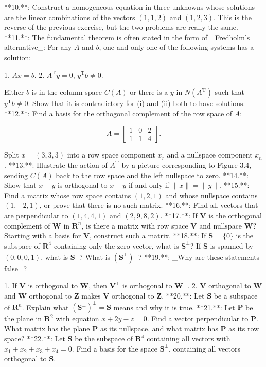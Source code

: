

**10.**: Construct a homogeneous equation in three unknowns whose solutions are the linear combinations of the vectors \((1,1,2)\) and \((1,2,3)\). This is the reverse of the previous exercise, but the two problems are really the same.
**11.**: The fundamental theorem is often stated in the form of _Fredholm's alternative_: For any \(A\) and \(b\), one and only one of the following systems has a solution:

1. \(Ax=b\).
2. \(A^{\mathrm{T}}y=0\), \(y^{\mathrm{T}}b\neq 0\).

Either \(b\) is in the column space \(C(A)\) or there is a \(y\) in \(N(A^{\mathrm{T}})\) such that \(y^{\mathrm{T}}b\neq 0\). Show that it is contradictory for (i) and (ii) both to have solutions.
**12.**: Find a basis for the orthogonal complement of the row space of \(A\):

\[A=\begin{bmatrix}1&0&2\\ 1&1&4\end{bmatrix}.\]

Split \(x=(3,3,3)\) into a row space component \(x_{r}\) and a nullspace component \(x_{n}\).
**13.**: Illustrate the action of \(A^{\mathrm{T}}\) by a picture corresponding to Figure 3.4, sending \(C(A)\) back to the row space and the left nullspace to zero.
**14.**: Show that \(x-y\) is orthogonal to \(x+y\) if and only if \(\|x\|=\|y\|\).
**15.**: Find a matrix whose row space contains \((1,2,1)\) and whose nullspace contains \((1,-2,1)\), or prove that there is no such matrix.
**16.**: Find all vectors that are perpendicular to \((1,4,4,1)\) and \((2,9,8,2)\).
**17.**: If \(\mathbf{V}\) is the orthogonal complement of \(\mathbf{W}\) in \(\mathbf{R}^{n}\), is there a matrix with row space \(\mathbf{V}\) and nullspace \(\mathbf{W}\)? Starting with a basis for \(\mathbf{V}\), construct such a matrix.
**18.**: If \(\mathbf{S}=\{0\}\) is the subspace of \(\mathbf{R}^{4}\) containing only the zero vector, what is \(\mathbf{S}^{\perp}\)? If \(\mathbf{S}\) is spanned by \((0,0,0,1)\), what is \(\mathbf{S}^{\perp}\)? What is \((\mathbf{S}^{\perp})^{\perp}\)?
**19.**: _Why are these statements false_?

1. If \(\mathbf{V}\) is orthogonal to \(\mathbf{W}\), then \(\mathbf{V}^{\perp}\) is orthogonal to \(\mathbf{W}^{\perp}\).
2. \(\mathbf{V}\) orthogonal to \(\mathbf{W}\) and \(\mathbf{W}\) orthogonal to \(\mathbf{Z}\) makes \(\mathbf{V}\) orthogonal to \(\mathbf{Z}\).
**20.**: Let \(\mathbf{S}\) be a subspace of \(\mathbf{R}^{n}\). Explain what \((\mathbf{S}^{\perp})^{\perp}=\mathbf{S}\) means and why it is true.
**21.**: Let \(\mathbf{P}\) be the plane in \(\mathbf{R}^{2}\) with equation \(x+2y-z=0\). Find a vector perpendicular to \(\mathbf{P}\). What matrix has the plane \(\mathbf{P}\) as its nullspace, and what matrix has \(\mathbf{P}\) as its row space?
**22.**: Let \(\mathbf{S}\) be the subspace of \(\mathbf{R}^{4}\) containing all vectors with \(x_{1}+x_{2}+x_{3}+x_{4}=0\). Find a basis for the space \(\mathbf{S}^{\perp}\), containing all vectors orthogonal to \(\mathbf{S}\).

